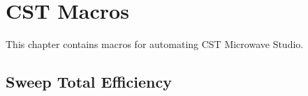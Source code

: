 \chapter{CST Macros}
This chapter contains macros for automating CST Microwave Studio.

\section{Sweep Total Efficiency}


